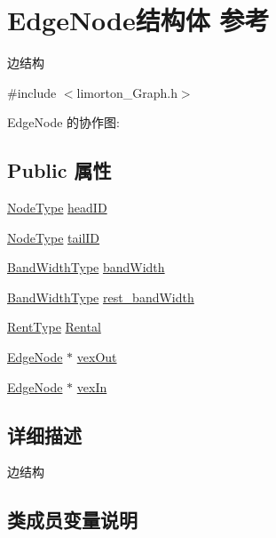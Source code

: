 \hypertarget{struct_edge_node}{}\section{Edge\+Node结构体 参考}
\label{struct_edge_node}


边结构  




{\ttfamily \#include $<$limorton\+\_\+\+Graph.\+h$>$}



Edge\+Node 的协作图\+:
\subsection*{Public 属性}
\begin{DoxyCompactItemize}
\item 
\hyperlink{limorton___graph_8h_a1b1a96beadaa686056e47989bf2a037e}{Node\+Type} \hyperlink{struct_edge_node_af3bed43ba69a11f72fdc3dcbbcf85134}{head\+ID}
\item 
\hyperlink{limorton___graph_8h_a1b1a96beadaa686056e47989bf2a037e}{Node\+Type} \hyperlink{struct_edge_node_afca78cdb32caff602631b2558129fcc4}{tail\+ID}
\item 
\hyperlink{limorton___graph_8h_af75ec072bd23242821f5cdbeea6f64de}{Band\+Width\+Type} \hyperlink{struct_edge_node_acfa7f39c14a26fa25ae5a28c12aefb24}{band\+Width}
\item 
\hyperlink{limorton___graph_8h_af75ec072bd23242821f5cdbeea6f64de}{Band\+Width\+Type} \hyperlink{struct_edge_node_a1e153bef71e62cbb99cbb5db422fca9b}{rest\+\_\+band\+Width}
\item 
\hyperlink{limorton___graph_8h_a1f3d1d745c99aef46faa0e3d7338470e}{Rent\+Type} \hyperlink{struct_edge_node_a8049f8b75c86bacee0e050fa405cbe63}{Rental}
\item 
\hyperlink{struct_edge_node}{Edge\+Node} $\ast$ \hyperlink{struct_edge_node_ad233cb7a63c1a934e27d8c41fd3dda19}{vex\+Out}
\item 
\hyperlink{struct_edge_node}{Edge\+Node} $\ast$ \hyperlink{struct_edge_node_a3dc9e3b6e0549a5fcd706d0400cacfa8}{vex\+In}
\end{DoxyCompactItemize}


\subsection{详细描述}
边结构 

\subsection{类成员变量说明}
\mbox{\label{struct_edge_node_acfa7f39c14a26fa25ae5a28c12aefb24}} 

